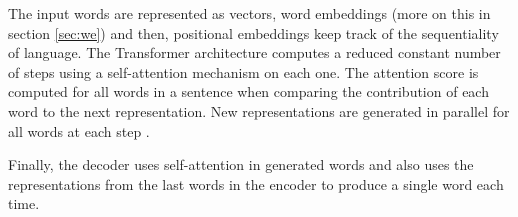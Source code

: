 \documentclass[11pt,a4paper]{article}
\begin{document}
The input words are represented as vectors, word embeddings (more on this in section \ref{sec:we}) and then, positional embeddings keep track of the sequentiality of language.
The Transformer architecture computes a reduced constant number of steps using a self-attention mechanism on each one. 
The attention score is computed for all words in a sentence when comparing the contribution of each word to the next representation.
New representations are generated in parallel for all words at each step .

Finally, the decoder uses self-attention in generated words and also uses the representations from the last words in the encoder to produce a single word each time.





\end{document}
